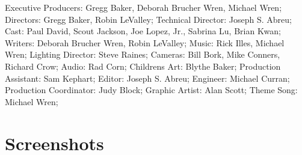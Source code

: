 Executive Producers: Gregg Baker, Deborah Brucher Wren, Michael Wren;
Directors: Gregg Baker, Robin LeValley;
Technical Director: Joseph S. Abreu;
Cast: Paul David, Scout Jackson, Joe Lopez, Jr., Sabrina Lu, Brian Kwan;
Writers: Deborah Brucher Wren, Robin LeValley;
Music: Rick Illes, Michael Wren;
Lighting Director: Steve Raines;
Cameras: Bill Bork, Mike Conners, Richard Crow;
Audio: Rad Corn;
Childrens Art: Blythe Baker;
Production Assistant: Sam Kephart;
Editor: Joseph S. Abreu;
Engineer: Michael Curran;
Production Coordinator: Judy Block;
Graphic Artist: Alan Scott;
Theme Song: Michael Wren;

\clearpage
\newpage

\section{Screenshots}

